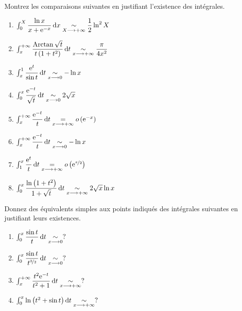 \begin{exoss}
Montrez les comparaisons suivantes en justifiant l'existence des intégrales.

\begin{enumerate}
    \item \(\int_0^X\dfrac{\ln x}{x+\e{-x}}\odif{x}\simqd{X\to\pinf}\dfrac{1}{2}\ln^2X\) \\
    \item \(\int_x^{\pinf}\dfrac{\Arctan\sqrt{t}}{t\paren{1+t^2}}\odif{t}\simqd{x\to\pinf}\dfrac{\pi}{4x^2}\) \\
    \item \(\int_x^1\dfrac{\e{t}}{\sin t}\odif{t}\simqd{x\to0}-\ln x\) \\
    \item \(\int_0^x\dfrac{\e{-t}}{\sqrt{t}}\odif{t}\simqd{x\to0}2\sqrt{x}\) \\
    \item \(\int_x^{\pinf}\dfrac{\e{-t}}{t}\odif{t}\egqd{x\to\pinf}\o{\e{-x}}\) \\
    \item \(\int_x^{\pinf}\dfrac{\e{-t}}{t}\odif{t}\simqd{x\to0}-\ln x\) \\
    \item \(\int_1^x\dfrac{\e{t}}{t}\odif{t}\egqd{x\to\pinf}\o{\e{\nicefrac{x}{2}}}\) \\
    \item \(\int_0^x\dfrac{\ln\paren{1+t^2}}{1+\sqrt{t}}\odif{t}\simqd{x\to\pinf}2\sqrt{x}\ln x\)
\end{enumerate}
\end{exoss}

\begin{exoss}
Donnez des équivalents simples aux points indiqués des intégrales suivantes en justifiant leurs existences.

\begin{enumerate}
    \item \(\int_0^x\dfrac{\sin t}{t}\odif{t}\simqd{x\to0}?\) \\
    \item \(\int_0^x\dfrac{\sin t}{t^{\nicefrac{3}{2}}}\odif{t}\simqd{x\to0}?\) \\
    \item \(\int_x^{\pinf}\dfrac{t^2\e{-t}}{t^2+1}\odif{t}\simqd{x\to\pinf}?\) \\
    \item \(\int_0^x\ln\paren{t^2+\sin t}\odif{t}\simqd{x\to\pinf}?\)
\end{enumerate}
\end{exoss}

